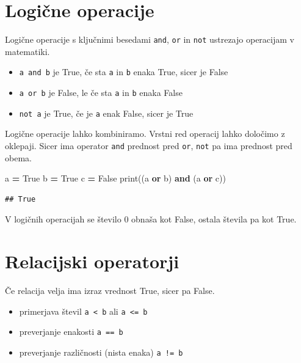 \documentclass[
]{book}
\newenvironment{Shaded}{\begin{snugshade}}{\end{snugshade}}
\newcommand{\BuiltInTok}[1]{#1}
\newcommand{\KeywordTok}[1]{\textcolor[rgb]{0.13,0.29,0.53}{\textbf{#1}}}
\newcommand{\NormalTok}[1]{#1}
\newcommand{\OperatorTok}[1]{\textcolor[rgb]{0.81,0.36,0.00}{\textbf{#1}}}
\newcommand{\VariableTok}[1]{\textcolor[rgb]{0.00,0.00,0.00}{#1}}
\providecommand{\tightlist}{%
  \setlength{\itemsep}{0pt}\setlength{\parskip}{0pt}}
\begin{document}
\hypertarget{logiux10dne-operacije}{%
\section{Logične operacije}\label{logiux10dne-operacije}}

Logične operacije s ključnimi besedami \texttt{and}, \texttt{or} in \texttt{not} ustrezajo operacijam v matematiki.

\begin{itemize}
\tightlist
\item
  \texttt{a\ and\ b} je True, če sta \texttt{a} in \texttt{b} enaka True, sicer je False
\item
  \texttt{a\ or\ b} je False, le če sta \texttt{a} in \texttt{b} enaka False
\item
  \texttt{not\ a} je True, če je \texttt{a} enak False, sicer je True
\end{itemize}

Logične operacije lahko kombiniramo. Vrstni red operacij lahko določimo z oklepaji.
Sicer ima operator \texttt{and} prednost pred \texttt{or}, \texttt{not} pa ima prednost pred obema.

\begin{Shaded}
\begin{Highlighting}[]
\NormalTok{a }\OperatorTok{=} \VariableTok{True}
\NormalTok{b }\OperatorTok{=} \VariableTok{True}
\NormalTok{c }\OperatorTok{=} \VariableTok{False}
\BuiltInTok{print}\NormalTok{((a }\KeywordTok{or}\NormalTok{ b) }\KeywordTok{and}\NormalTok{ (a }\KeywordTok{or}\NormalTok{ c))}
\end{Highlighting}
\end{Shaded}

\begin{verbatim}
## True
\end{verbatim}

V logičnih operacijah se število 0 obnaša kot False, ostala števila pa kot True.

\hypertarget{relacijski-operatorji}{%
\section{Relacijski operatorji}\label{relacijski-operatorji}}

Če relacija velja ima izraz vrednost True, sicer pa False.

\begin{itemize}
\tightlist
\item
  primerjava števil \texttt{a\ \textless{}\ b} ali \texttt{a\ \textless{}=\ b}
\item
  preverjanje enakosti \texttt{a\ ==\ b}
\item
  preverjanje različnosti (nista enaka) \texttt{a\ !=\ b}
\end{itemize}
\end{document}
